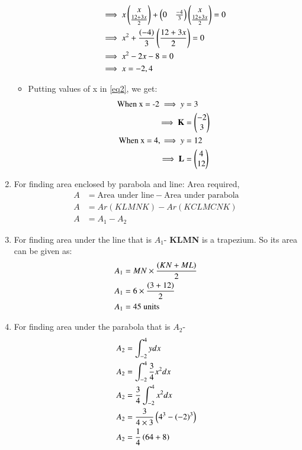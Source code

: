 \documentclass[journal,12pt,twocolumn]{IEEEtran}
\begin{document}
\begin{enumerate}
\begin{itemize}
\begin{align}
    \end{align}
    \begin{align}
    &\implies x\begin{pmatrix}x\\\frac{12+3x}{2}\end{pmatrix}+\begin{pmatrix}0&\frac{-4}{3}\end{pmatrix}\begin{pmatrix}x\\\frac{12+3x}{2}\end{pmatrix}=0
    \\
    &\implies x^2+\frac{\left(-4\right)}{3}\left(\frac{12+3x}{2}\right)=0
    \\
    &\implies x^2-2x-8=0
    \\
    &\implies x=-2,4
\end{align}
\item Putting values of x in \eqref{eq2}, we get:
\begin{align}
\text{When x = -2}\implies y&=3
\\
\implies \mathbf{K}&= \begin{pmatrix}-2\\3\end{pmatrix}  
\\
\text{When x = 4},\implies y&=12
\\
\implies \mathbf{L}&= \begin{pmatrix}4\\12\end{pmatrix}
\end{align}
\end{itemize}
\item For finding area enclosed by parabola and line:
  Area required,
\begin{align}
   A&= \text{Area under line} - \text{Area under parabola}
     \\
   A&= Ar(KLMNK)-Ar(KCLMCNK)
    \\
    A&= A_1 -A_2 \label{eqAREA}
    \end{align}
\item For finding area under the line that is $A_1$-
\textbf{KLMN} is a trapezium. So its area can be given as:
\begin{align}
  A_1 &= MN\times\frac{\left(KN+ML\right)}{2} 
  \\
   A_1 &= 6\times\frac{\left(3+12\right)}{2} 
   \\
    A_1 &=45 \text{ units} \label{eqB}
\end{align}
\item For finding area under the parabola that is $A_2$-
\begin{align}
    A_2&= \int_{-2}^{4} y dx
    \\
    A_2&= \int_{-2}^{4} \frac{3}{4} x^2 dx
    \\
    A_2&= \frac{3}{4} \int_{-2}^{4}  x^2 dx
    \\
    A_2&= \frac{3}{4\times3} \brak{4^3-\brak{-2}^3}
    \\
    A_2&= \frac{1}{4} \brak{64 +8}

\end{align}
\end{enumerate}
\end{document}
